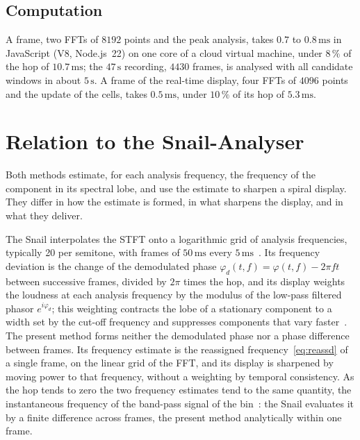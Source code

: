 \documentclass[10pt,a4paper,twocolumn]{article}
\newcommand{\s}{\,\mathrm{s}}
\newcommand{\ms}{\,\mathrm{ms}}
\begin{document}
\subsection{Computation}

A frame, two FFTs of $8192$ points and the peak analysis, takes $0.7$ to $0.8\ms$ in JavaScript (V8, Node.js~22) on one core of a cloud virtual machine, under $8\,\%$ of the hop of $10.7\ms$; the $47\s$ recording, $4430$ frames, is analysed with all candidate windows in about $5\s$. A frame of the real-time display, four FFTs of $4096$ points and the update of the cells, takes $0.5\ms$, under $10\,\%$ of its hop of $5.3\ms$.

\section{Relation to the Snail-Analyser}
\label{sec:snail}

Both methods estimate, for each analysis frequency, the frequency of the component in its spectral lobe, and use the estimate to sharpen a spiral display. They differ in how the estimate is formed, in what sharpens the display, and in what they deliver.

The Snail interpolates the STFT onto a logarithmic grid of analysis frequencies, typically 20 per semitone, with frames of $50\ms$ every $5\ms$~\cite{HelieTimbre}. Its frequency deviation is the change of the demodulated phase $\varphi_d(t,f) = \varphi(t,f) - 2\pi f t$ between successive frames, divided by $2\pi$ times the hop, and its display weights the loudness at each analysis frequency by the modulus of the low-pass filtered phasor $e^{i\varphi_d}$; this weighting contracts the lobe of a stationary component to a width set by the cut-off frequency and suppresses components that vary faster~\cite{HelieTimbre,HeliePatent}. The present method forms neither the demodulated phase nor a phase difference between frames. Its frequency estimate is the reassigned frequency~\eqref{eq:reassd} of a single frame, on the linear grid of the FFT, and its display is sharpened by moving power to that frequency, without a weighting by temporal consistency. As the hop tends to zero the two frequency estimates tend to the same quantity, the instantaneous frequency of the band-pass signal of the bin~\cite{Kodera78,AugerFlandrin}: the Snail evaluates it by a finite difference across frames, the present method analytically within one frame.
\end{document}
